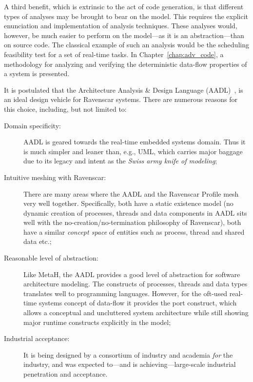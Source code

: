 A third benefit, which is extrinsic to the act of code generation, is
that different types of analyses may be brought to bear on the
model. This requires the explicit enunciation and implementation of
analysis techniques. These analyses would, however, be much easier to
perform on the model---as it is an abstraction---than on source
code. The classical example of such an analysis would be the
scheduling feasibility test for a set of real-time tasks. In
Chapter~\ref{chap:adv_code}, a methodology for analyzing and verifying
the deterministic data-flow properties of a system is presented.

It is postulated that the Architecture Analysis \& Design Language
(AADL)~\cite{AS5506}, is an ideal design vehicle for Ravenscar
systems. There are numerous reasons for this choice, including, but
not limited to:

\begin{description}
\item[Domain specificity:]{AADL is geared towards the real-time
  embedded systems domain. Thus it is much simpler and leaner than,
  e.g., UML, which carries major baggage due to its legacy and intent
  as the \emph{Swiss army knife of modeling};}
\item[Intuitive meshing with Ravenscar:]{There are many areas where
  the AADL and the Ravenscar Profile mesh very well
  together. Specifically, both have a static existence model (no
  dynamic creation of processes, threads and data components in AADL
  sits well with the no-creation/no-termination philosophy of
  Ravenscar), both have a similar \emph{concept space} of entities
  such as process, thread and shared data etc.;}
\item[Reasonable level of abstraction:]{Like MetaH, the AADL provides
  a good level of abstraction for software architecture modeling. The
  constructs of processes, threads and data types translates well to
  programming languages. However, for the oft-used real-time systems
  concept of data-flow it provides the port construct, which allows a
  conceptual and uncluttered system architecture while still showing
  major runtime constructs explicitly in the model;}
\item[Industrial acceptance:]{It is being designed by a consortium of
  industry and academia \emph{for} the industry, and was expected
  to---and is achieving---large-scale industrial penetration and
  acceptance.}
\end{description}

